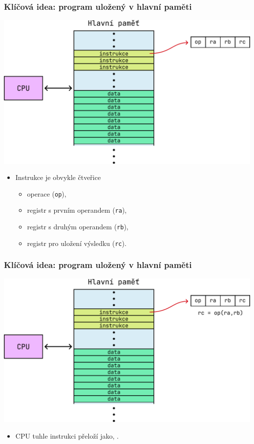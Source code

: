 \documentclass[aspectratio=169,11pt,svgnames,handout]{beamer}
\begin{document}
\begin{frame}
 \frametitle{Klíčová idea: program uložený v hlavní paměti}
 \begin{center}
  \includegraphics[width=.5\textwidth]{instructions-2.pdf}
 \end{center}
 \vspace*{-3em}
 \begin{itemize}[label=\textbullet]
  \item \alert{Instrukce} je obvykle čtveřice
  \begin{itemize}[label=\textemdash]
   \item operace (\texttt{op}),
   \item registr s prvním operandem (\texttt{ra}),
   \item registr s druhým operandem (\texttt{rb}),
   \item registr pro uložení výsledku (\texttt{rc}).
  \end{itemize}
 \end{itemize}
\end{frame}

\begin{frame}
 \frametitle{Klíčová idea: program uložený v hlavní paměti}
 \begin{center}
  \includegraphics[width=.5\textwidth]{instructions-3.pdf}
 \end{center}
 \vspace*{-1em}
 \begin{itemize}[label=\textbullet]
  \item CPU tuhle instrukci přeloží jako, .
 \end{itemize}
\end{frame}
\end{document}
